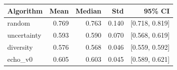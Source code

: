 \begin{tabular}{lrrrr}
\hline
Algorithm & Mean & Median & Std & 95\% CI \\
\hline
random & 0.769 & 0.763 & 0.140 & [0.718, 0.819] \\
uncertainty & 0.593 & 0.590 & 0.070 & [0.568, 0.619] \\
diversity & 0.576 & 0.568 & 0.046 & [0.559, 0.592] \\
echo\_v0 & 0.605 & 0.603 & 0.045 & [0.589, 0.621] \\
\hline
\end{tabular}
